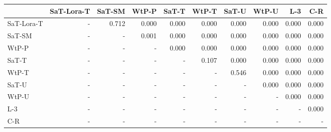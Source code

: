 \begin{tabular}{lrrrrrrrrr}
\toprule
 & SaT-Lora-T & SaT-SM & WtP-P & SaT-T & WtP-T & SaT-U & WtP-U & L-3 & C-R \\
\midrule
SaT-Lora-T & - & 0.712 & 0.000 & 0.000 & 0.000 & 0.000 & 0.000 & 0.000 & 0.000 \\
SaT-SM & - & - & 0.001 & 0.000 & 0.000 & 0.000 & 0.000 & 0.000 & 0.000 \\
WtP-P & - & - & - & 0.000 & 0.000 & 0.000 & 0.000 & 0.000 & 0.000 \\
SaT-T & - & - & - & - & 0.107 & 0.000 & 0.000 & 0.000 & 0.000 \\
WtP-T & - & - & - & - & - & 0.546 & 0.000 & 0.000 & 0.000 \\
SaT-U & - & - & - & - & - & - & 0.000 & 0.000 & 0.000 \\
WtP-U & - & - & - & - & - & - & - & 0.000 & 0.000 \\
L-3 & - & - & - & - & - & - & - & - & 0.000 \\
C-R & - & - & - & - & - & - & - & - & - \\
\bottomrule
\end{tabular}

